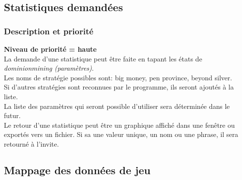 \documentclass{scrreprt}
\begin{document}
\subsection{Statistiques demandées}
\subsubsection{Description et priorité}
\textbf{Niveau de priorité = haute}\\
La demande d'une statistique peut être faite en tapant les états de \textit{dominionmining (paramètres)}.  \\
Les noms de stratégie possibles sont: big money, pen province, beyond silver.\\
Si d'autres stratégies sont reconnues par le programme, ils seront ajoutés à la liste.\\
La liste des paramètres qui seront possible d'utiliser sera déterminée dans le futur.\\

Le retour d'une statistique peut être un graphique affiché dans une fenêtre ou exportés vers un fichier. Si sa une valeur unique, un nom ou une phrase, il sera retourné à l'invite.

\subsection{Mappage des données de jeu}
\end{document}

